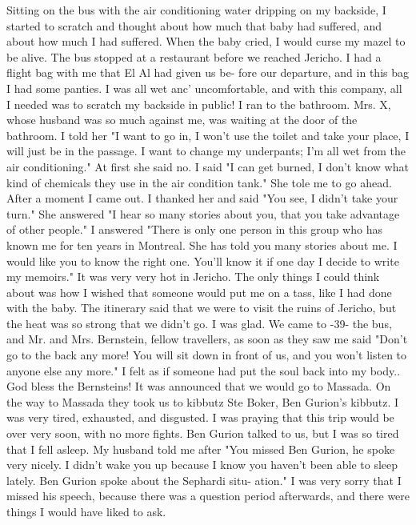 Sitting on the bus with the air conditioning water dripping on my 
backside, I started to scratch and thought about how much that baby had 
suffered, and about how much I had suffered. When the baby cried, I would 
curse my mazel to be alive. The bus stopped at a restaurant before we 
reached Jericho. I had a flight bag with me that El Al had given us be-
fore our departure, and in this bag I had some panties. I was all wet anc' 
uncomfortable, and with this company, all I needed was to scratch my backside in public! I ran to the bathroom. Mrs. X, whose husband was so 
much against me, was waiting at the door of the bathroom. I told her "I 
want to go in, I won't use the toilet and take your place, I will just be 
in the passage. I want to change my underpants; I'm all wet from the air 
conditioning." At first she said no. I said "I can get burned, I don't 
know what kind of chemicals they use in the air condition tank." She tole 
me to go ahead. After a moment I came out. I thanked her and said "You 
see, I didn't take your turn." She answered "I hear so many stories about you, that you take advantage of other people." I answered "There is only one person in this group who has known me for ten years in Montreal. She has told you many stories about me. I would like you to know 
the right one. You'll know it if one day I decide to write my memoirs." 
It was very very hot in Jericho. The only things I could think about 
was how I wished that someone would put me on a tass, like I had done with the baby. The itinerary said that we were to visit the ruins of Jericho, but the heat was so strong that we didn't  go. I was glad. We came to 
-39- 
the bus, and Mr. and Mrs. Bernstein, fellow travellers, as soon as 
they saw me said "Don't go to the back any more! You will sit down in 
front of us, and you won't listen to anyone else any more." I felt as if 
someone had put the soul back into my body.. God bless the Bernsteins! 
It was announced that we would go to Massada. On the way to Massada 
they took us to kibbutz Ste Boker, Ben Gurion's kibbutz. I was very tired, 
exhausted, and disgusted. I was praying that this trip would be over 
very soon, with no more fights. Ben Gurion talked to us, but I was so 
tired that I fell asleep. My husband told me after "You missed Ben Gurion, 
he spoke very nicely. I didn't wake you up because I know you haven't 
been able to sleep lately. Ben Gurion spoke about the Sephardi situ-
ation." I was very sorry that I missed his speech, because there was a 
question period afterwards, and there were things I would have liked to 
ask. 
